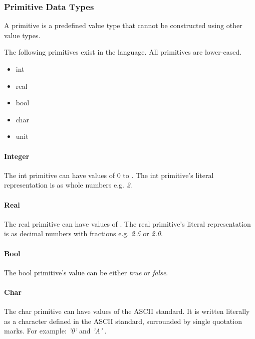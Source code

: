 \subsubsection{Primitive Data Types}
\label{subsec:primitives}

A primitive is a predefined value type that cannot be constructed using other value types.

The following primitives exist in the language. All primitives are lower-cased.

\begin{itemize}
  \item int
  \item real
  \item bool
  \item char
  \item unit
\end{itemize}

\paragraph{Integer}
\label{subsubsec:int}

The int primitive can have values of 0 to . The int primitive's literal representation is as whole numbers e.g. \emph{2}.

\paragraph{Real}
\label{subsubsec:real}

The real primitive can have values of . The real primitive's literal representation is as decimal numbers with fractions e.g. \emph{2.5} or \emph{2.0}.

\paragraph{Bool}
\label{subsubsec:bool}

The bool primitive's value can be either \emph{true} or \emph{false}.

\paragraph{Char}
\label{sec:char}

The char primitive can have values of the ASCII standard. It is written literally as a character defined in the ASCII standard, surrounded by single quotation marks. For example: \emph{ '0' } and \emph{ 'A' }.

